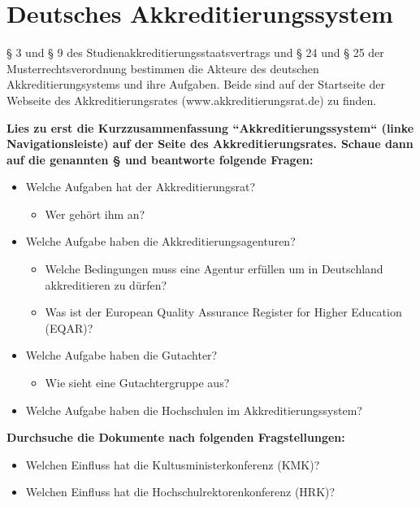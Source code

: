 \documentclass{scrartcl}
\begin{document}
\pagestyle{scrheadings}
\clearscrheadfoot
{}
\section*{Deutsches Akkreditierungssystem}

§ 3 und § 9 des Studienakkreditierungsstaatsvertrags und § 24 und § 25 der Musterrechtsverordnung bestimmen die Akteure des deutschen Akkreditierungsystems und ihre Aufgaben. Beide sind auf der Startseite der Webseite des Akkreditierungsrates (www.akkreditierungsrat.de) zu finden. \\

\vspace{1cm}

\textbf{Lies zu erst die Kurzzusammenfassung ``Akkreditierungssystem`` (linke Navigationsleiste) auf der Seite des Akkreditierungsrates. Schaue dann auf die genannten § und beantworte folgende Fragen:}

\begin{itemize}
\item Welche Aufgaben hat der Akkreditierungsrat?
	\begin{itemize}
		\item Wer gehört ihm an?
	\end{itemize}
\item Welche Aufgabe haben die Akkreditierungsagenturen? 
	\begin{itemize}
		\item Welche Bedingungen muss eine Agentur erfüllen um in Deutschland akkreditieren zu dürfen?
		\item Was ist der European Quality Assurance Register for Higher Education (EQAR)?
	\end{itemize}
\item Welche Aufgabe haben die Gutachter? 
	\begin{itemize}
		\item Wie sieht eine Gutachtergruppe aus?
	\end{itemize}
\item Welche Aufgabe haben die Hochschulen im Akkreditierungssystem?
\end{itemize}

\textbf{Durchsuche die Dokumente nach folgenden Fragstellungen:}
\begin{itemize}
\item Welchen Einfluss hat die Kultusministerkonferenz (KMK)?
\item Welchen Einfluss hat die Hochschulrektorenkonferenz (HRK)?
\end{itemize}
\end{document}
